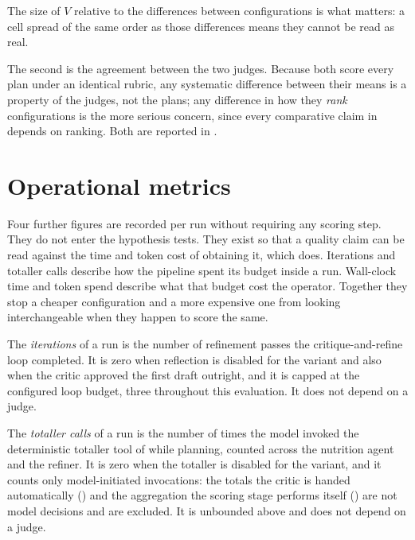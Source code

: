 The size of $V$ relative to the differences between configurations is what matters: a cell spread of the same order as those differences means they cannot be read as real.

The second is the agreement between the two judges. Because both score every plan under an identical rubric, any systematic difference between their means is a property of the judges, not the plans; any difference in how they \emph{rank} configurations is the more serious concern, since every comparative claim in  depends on ranking. Both are reported in .

\section{Operational metrics}
\label{sec:methodology-operational}

Four further figures are recorded per run without requiring any scoring step. They do not enter the hypothesis tests. They exist so that a quality claim can be read against the time and token cost of obtaining it, which  does. Iterations and totaller calls describe how the pipeline spent its budget inside a run. Wall-clock time and token spend describe what that budget cost the operator. Together they stop a cheaper configuration and a more expensive one from looking interchangeable when they happen to score the same.

\begin{definition}[Iterations]
    \label{def:iterations}
    The \emph{iterations} of a run is the number of refinement passes the critique-and-refine loop completed. It is zero when reflection is disabled for the variant and also when the critic approved the first draft outright, and it is capped at the configured loop budget, three throughout this evaluation. It does not depend on a judge.
\end{definition}

\begin{definition}
    \label{def:totaller-calls}
    The \emph{totaller calls} of a run is the number of times the model invoked the deterministic totaller tool of  while planning, counted across the nutrition agent and the refiner. It is zero when the totaller is disabled for the variant, and it counts only model-initiated invocations: the totals the critic is handed automatically () and the aggregation the scoring stage performs itself () are not model decisions and are excluded. It is unbounded above and does not depend on a judge.
\end{definition}

